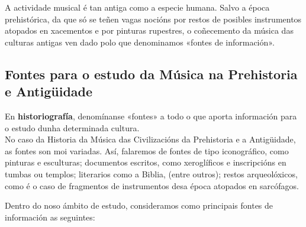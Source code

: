\documentclass[a4paper, twoside]{templates/ociamthesis}
\begin{document}
A actividade musical é tan antiga como a especie humana. Salvo a época prehistórica, da que só se teñen vagas nocións por restos de posibles instrumentos atopados en xacementos e por pinturas rupestres, o coñecemento da música das culturas antigas ven dado polo que denominamos «fontes de información».

\hypertarget{fontes-para-o-estudo-da-muxfasica-na-prehistoria-e-antiguxfcidade}{%
\subsection*{Fontes para o estudo da Música na Prehistoria e Antigüidade}\label{fontes-para-o-estudo-da-muxfasica-na-prehistoria-e-antiguxfcidade}}

En \textbf{historiografía}, denomínanse «fontes» a todo o que aporta información para o estudo dunha determinada cultura.\\
No caso da Historia da Música das Civilizacións da Prehistoria e a Antigüidade, as fontes son moi variadas. Así, falaremos de fontes de tipo iconográfico, como pinturas e esculturas; documentos escritos, como xeroglíficos e inscripcións en tumbas ou templos; literarios como a Biblia, (entre outros); restos arqueolóxicos, como é o caso de fragmentos de instrumentos desa época atopados en sarcófagos.

Dentro do noso ámbito de estudo, consideramos como principais fontes de información as seguintes:
\end{document}
